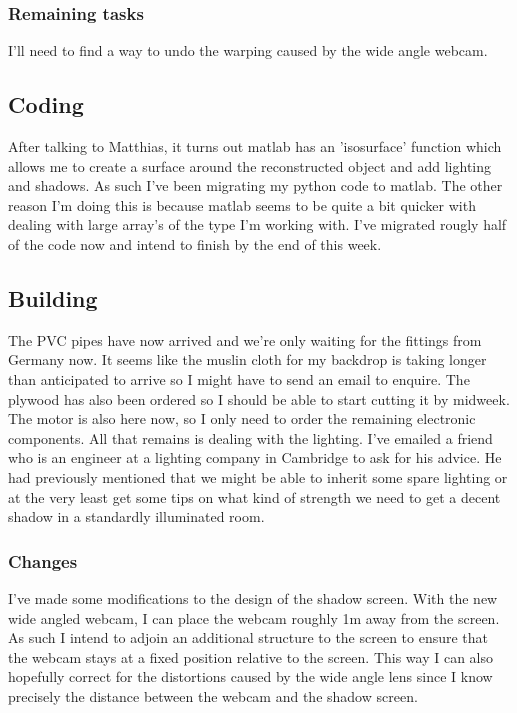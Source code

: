 \documentclass[a4paper]{article}
\begin{document}
\subsubsection{Remaining tasks}
I'll need to find a way to undo the warping caused by the wide angle webcam.

\subsection{Coding}
After talking to Matthias, it turns out matlab has an 'isosurface' function which allows me to create a surface around the reconstructed object and add lighting and shadows. As such I've been migrating my python code to matlab.
The other reason I'm doing this is because matlab seems to be quite a bit quicker with dealing with large array's of the type I'm working with.
I've migrated rougly half of the code now and intend to finish by the end of this week.

\subsection{Building}
The PVC pipes have now arrived and we're only waiting for the fittings from Germany now.
It seems like the muslin cloth for my backdrop is taking longer than anticipated to arrive so I might have to send an email to enquire.
The plywood has also been ordered so I should be able to start cutting it by midweek.
The motor is also here now, so I only need to order the remaining electronic components.
All that remains is dealing with the lighting. 
I've emailed a friend who is an engineer at a lighting company in Cambridge to ask for his advice. 
He had previously mentioned that we might be able to inherit some spare lighting or at the very least get some tips on what kind of strength we need to get a decent shadow in a standardly illuminated room.

\subsubsection{Changes}
I've made some modifications to the design of the shadow screen.
With the new wide angled webcam, I can place the webcam roughly 1m away from the screen. As such I intend to adjoin an additional structure to the screen to ensure that the webcam stays at a fixed position relative to the screen.
This way I can also hopefully correct for the distortions caused by the wide angle lens since I know precisely the distance between the webcam and the shadow screen.
\end{document}
